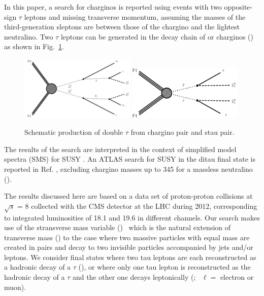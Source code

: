 In this paper, a search for charginos is reported using events 
with two opposite-sign $\tau$ leptons and 
missing transverse momentum, assuming the masses of the third-generation sleptons are between those of the 
chargino and the lightest neutralino. 
Two $\tau$ leptons can be generated in the decay chain of \sTau 
or charginos (\PSGcpDo) as shown in Fig.~\ref{fig:Productions}. 
\begin{figure}[!htb]
\centering
\includegraphics[width=0.49\textwidth]{Introductionfigs/TChipmSlepSnu.pdf}
\includegraphics[width=0.49\textwidth]{Introductionfigs/TSlepSlep.pdf}
\caption{Schematic production of double $\tau$ from chargino pair and stau pair.}
\label{fig:Productions}
\end{figure}
The results of the search are interpreted in the context of simplified model spectra (SMS) for SUSY \cite{Alwall:2008ag,alves:sms}.
An ATLAS search for SUSY in the ditau final state is reported in Ref. \cite{Aad:2014yka}, excluding chargino masses up to 345 \GeV 
for a massless neutralino (\PSGczDo).

The results discussed here are based on a data set of proton-proton 
collisions at $\sqrt{s}$ = 8\TeV
collected with the CMS detector at the LHC during 2012, corresponding to integrated
luminosities of 18.1 and 19.6 \invfb in different channels. 
Our search makes use of the stransverse mass variable (\mttwo)~\cite{Lester:1999tx,Barr:2003rg}
which is the natural extension of transverse mass (\mt) to the case 
where two massive particles with equal mass are created in pairs and decay 
to two invisible particles accompanied by jets and/or leptons.  We consider final states where
two tau leptons are each reconstructed as a hadronic decay of a $\tau$ (\tauTau), or where only one tau lepton is reconstructed as the hadronic 
decay of a $\tau$ and the other one decays leptonically (\leptonTau;~ $\ell=$ electron or muon).

